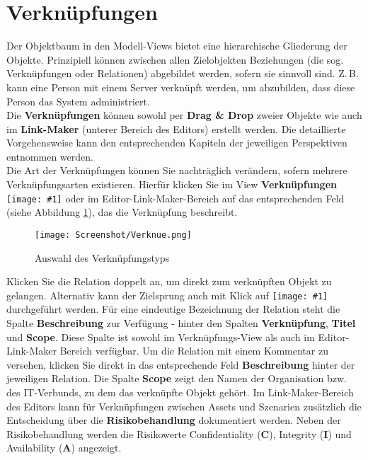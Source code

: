 \documentclass[a4paper,10pt]{book}
\newcommand{\icon}[1]{\texttt{[image: \#1]}}
\begin{document}
\section{Verknüpfungen}
Der Objektbaum in den Modell-Views bietet eine hierarchische Gliederung der
Objekte. Prinzipiell können zwischen allen Zielobjekten Beziehungen (die sog.
Verknüpfungen oder Relationen) abgebildet werden, sofern sie sinnvoll sind.
Z.\,B. kann eine Person mit einem Server verknüpft werden, um abzubilden, dass
diese Person das System administriert.
\newline\\
Die \textbf{Verknüpfungen} können sowohl per \textbf{Drag \& Drop}
zweier Objekte wie auch im \textbf{Link-Maker} (unterer Bereich des
Editors) erstellt werden.  Die detaillierte Vorgehensweise kann den
entsprechenden Kapiteln der jeweiligen Perspektiven entnommen werden.
\newline\\
Die Art der Verknüpfungen können Sie nachträglich verändern, sofern
mehrere Verknüpfungsarten existieren. Hierfür klicken Sie im View
\textbf{Verknüpfungen} \icon{Icon/Relationen.png}
oder im Editor-Link-Maker-Bereich auf das entsprechenden Feld (siehe
Abbildung \ref{Auswahl des Verknuepfungstyps}), das die Verknüpfung
beschreibt.  \newline
\begin{figure}[htb!]
  \centering
  \texttt{[image: Screenshot/Verknue.png]}
  \caption{\label{Auswahl des Verknuepfungstyps} Auswahl des Verknüpfungstyps}
\end{figure}
\newline
Klicken Sie die Relation doppelt an, um direkt zum verknüpften Objekt zu gelangen. Alternativ kann der Zielsprung auch mit
Klick auf \icon{Icon/Ziel.png} durchgeführt werden. Für eine eindeutige Bezeichnung der Relation steht die Spalte
\textbf{Beschreibung} zur Verfügung - hinter den Spalten \textbf{Verknüpfung}, \textbf{Titel} und \textbf{Scope}. Diese Spalte ist sowohl im Verknüpfungs-View
als auch im Editor-Link-Maker Bereich verfügbar. Um die Relation mit einem Kommentar zu versehen, klicken Sie direkt in das entsprechende Feld
\textbf{Beschreibung} hinter der jeweiligen Relation. Die Spalte \textbf{Scope} zeigt den Namen der Organisation bzw. des IT-Verbunds, zu dem das verknüpfte Objekt gehört.
Im Link-Maker-Bereich des Editors kann für Verknüpfungen zwischen Assets und Szenarien zusätzlich die Entscheidung über die \textbf{Risikobehandlung} dokumentiert werden.
Neben der Risikobehandlung werden die Risikowerte Confidentiality (\textbf{C}), Integrity (\textbf{I}) und Availability (\textbf{A}) angezeigt.
\end{document}
